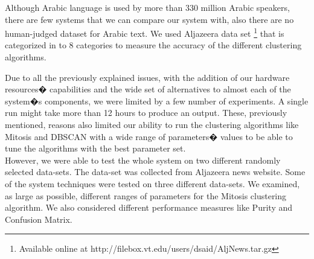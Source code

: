 Although Arabic language is used by more than $330$ million Arabic speakers, there are few systems that we can compare our system with, also there are no human-judged dataset for Arabic text. We used Aljazeera data set \footnote[1]{Available online at http://filebox.vt.edu/users/dsaid/AljNews.tar.gz} that is categorized in to $8$ categories to measure the accuracy of the different clustering algorithms.

Due to all the previously explained issues, with the addition of our hardware resources� capabilities and the wide set of alternatives to almost each of the system�s components, we were limited by a few number of experiments. A single run might take more than 12 hours to produce an output. These, previously mentioned, reasons also limited our ability to run the clustering algorithms like Mitosis and DBSCAN with a wide range of parameters� values to be able to tune the algorithms with the best parameter set.\\
However, we were able to test the whole system on two different randomly selected data-sets. The data-set was collected from Aljazeera news website. Some of the system techniques were tested on three different data-sets. We examined, as large as possible, different ranges of parameters for the Mitosis clustering algorithm. We also considered different performance measures like Purity and Confusion Matrix.\\


